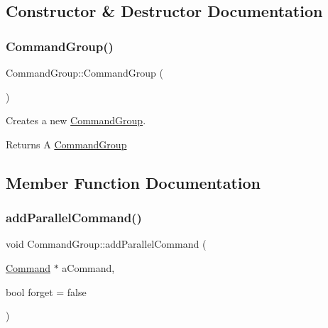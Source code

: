 \subsection{Constructor \& Destructor Documentation}
\mbox{\label{classlib_iterative_robot_1_1_command_group_a862143e691209986739c234cb0fc4cc8}} 
\subsubsection{\texorpdfstring{CommandGroup()}{CommandGroup()}}
{\footnotesize\ttfamily Command\+Group\+::\+Command\+Group (\begin{DoxyParamCaption}{ }\end{DoxyParamCaption})}



Creates a new \mbox{\hyperlink{classlib_iterative_robot_1_1_command_group}{Command\+Group}}. 

\begin{DoxyReturn}{Returns}
A \mbox{\hyperlink{classlib_iterative_robot_1_1_command_group}{Command\+Group}} 
\end{DoxyReturn}


\subsection{Member Function Documentation}
\mbox{\label{classlib_iterative_robot_1_1_command_group_a7255a0b640e74ce74870939b45d23a58}} 
\subsubsection{\texorpdfstring{addParallelCommand()}{addParallelCommand()}}
{\footnotesize\ttfamily void Command\+Group\+::add\+Parallel\+Command (\begin{DoxyParamCaption}\item[{\mbox{\hyperlink{classlib_iterative_robot_1_1_command}{Command}} $\ast$}]{a\+Command,  }\item[{bool}]{forget = {\ttfamily false} }\end{DoxyParamCaption})}



